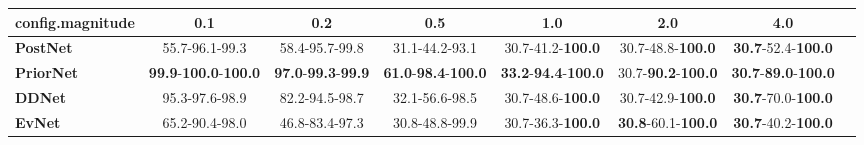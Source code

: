 \begin{tabular}{lccccccc}
\toprule
\textbf{config.magnitude} &                                          0.1 &                                        0.2 &                                         0.5 &                                         1.0 &                                2.0 &                                         4.0 \\
\midrule
\textbf{PostNet } &                               55.7-96.1-99.3 &                             58.4-95.7-99.8 &                              31.1-44.2-93.1 &                    30.7-41.2-\textbf{100.0} &           30.7-48.8-\textbf{100.0} &           \textbf{30.7}-52.4-\textbf{100.0} \\
\textbf{PriorNet} &  \textbf{99.9}-\textbf{100.0}-\textbf{100.0} &  \textbf{97.0}-\textbf{99.3}-\textbf{99.9} &  \textbf{61.0}-\textbf{98.4}-\textbf{100.0} &  \textbf{33.2}-\textbf{94.4}-\textbf{100.0} &  30.7-\textbf{90.2}-\textbf{100.0} &  \textbf{30.7}-\textbf{89.0}-\textbf{100.0} \\
\textbf{DDNet   } &                               95.3-97.6-98.9 &                             82.2-94.5-98.7 &                              32.1-56.6-98.5 &                    30.7-48.6-\textbf{100.0} &           30.7-42.9-\textbf{100.0} &           \textbf{30.7}-70.0-\textbf{100.0} \\
\textbf{EvNet   } &                               65.2-90.4-98.0 &                             46.8-83.4-97.3 &                              30.8-48.8-99.9 &                    30.7-36.3-\textbf{100.0} &  \textbf{30.8}-60.1-\textbf{100.0} &           \textbf{30.7}-40.2-\textbf{100.0} \\
\bottomrule
\end{tabular}
